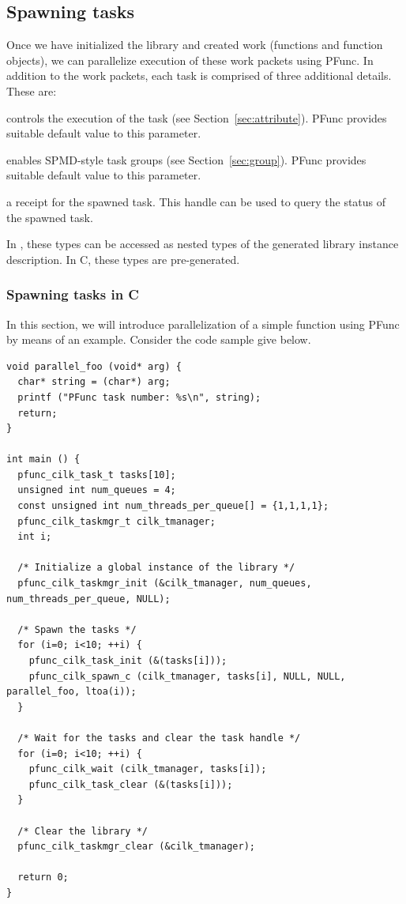 \subsection{Spawning tasks}
Once we have initialized the library and created work (functions and function
objects), we can parallelize execution of these work packets using PFunc. In 
addition to the work packets, each task is comprised of three additional 
details. These are:

\begin{list}{}{\leftmargin=1em}
\item {} controls the execution of the task (see
Section~\ref{sec:attribute}).  PFunc provides suitable default value to this
parameter.
\item {} enables SPMD-style task groups (see
Section~\ref{sec:group}).  PFunc provides suitable default value to this
parameter.
\item {} a receipt for the spawned task. This handle can be 
used to query the status of the spawned task.
\end{list}

In \Cpp{}, these types can be accessed as nested types of the generated library
instance description. In C, these types are pre-generated. 

\subsubsection{Spawning tasks in C}
\label{subsubsec:spawn_c}
In this section, we will introduce parallelization of a simple function using 
PFunc by means of an example. Consider the code sample give below.

\begin{lstlisting}
void parallel_foo (void* arg) {
  char* string = (char*) arg;
  printf ("PFunc task number: %s\n", string);
  return;
}

int main () {
  pfunc_cilk_task_t tasks[10];
  unsigned int num_queues = 4;
  const unsigned int num_threads_per_queue[] = {1,1,1,1};
  pfunc_cilk_taskmgr_t cilk_tmanager;
  int i;

  /* Initialize a global instance of the library */
  pfunc_cilk_taskmgr_init (&cilk_tmanager, num_queues, num_threads_per_queue, NULL);

  /* Spawn the tasks */
  for (i=0; i<10; ++i) {
    pfunc_cilk_task_init (&(tasks[i]));
    pfunc_cilk_spawn_c (cilk_tmanager, tasks[i], NULL, NULL, parallel_foo, ltoa(i));
  }

  /* Wait for the tasks and clear the task handle */
  for (i=0; i<10; ++i) {
    pfunc_cilk_wait (cilk_tmanager, tasks[i]);
    pfunc_cilk_task_clear (&(tasks[i]));
  }

  /* Clear the library */
  pfunc_cilk_taskmgr_clear (&cilk_tmanager);

  return 0;
}
\end{lstlisting}

